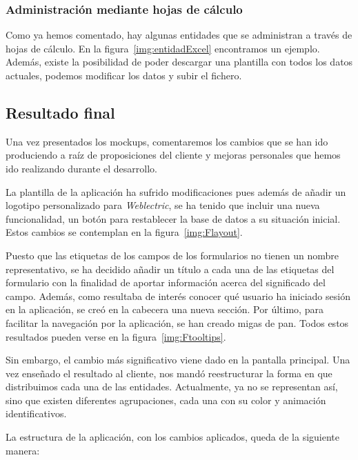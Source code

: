 \subsubsection{Administración mediante hojas de cálculo} 

Como ya hemos comentado, hay algunas entidades que se administran a través de hojas de cálculo. En la figura~\ref{img:entidadExcel} encontramos un ejemplo. Además, existe la posibilidad de poder descargar una plantilla con todos los datos actuales, podemos modificar los datos y subir el fichero. 

\newpage

\subsection{Resultado final} 

Una vez presentados los mockups, comentaremos los cambios que se han ido produciendo a raíz de proposiciones del cliente y mejoras personales que hemos ido realizando durante el desarrollo.

La plantilla de la aplicación ha sufrido modificaciones pues además de añadir un logotipo personalizado para \textit{Weblectric}, se ha tenido que incluir una nueva funcionalidad, un botón para restablecer la base de datos a su situación inicial. Estos cambios se contemplan en la figura~\ref{img:Flayout}.

Puesto que las etiquetas de los campos de los formularios no tienen un nombre representativo, se ha decidido añadir un título a cada una de las etiquetas del formulario con la finalidad de aportar información acerca del significado del campo. Además, como resultaba de interés conocer qué usuario ha iniciado sesión en la aplicación, se creó en la cabecera una nueva sección. Por último, para facilitar la navegación por la aplicación, se han creado migas de pan. Todos estos resultados pueden verse en la figura~\ref{img:Ftooltips}.

Sin embargo, el cambio más significativo viene dado en la pantalla principal. Una vez enseñado el resultado al cliente, nos mandó reestructurar la forma en que distribuimos cada una de las entidades. Actualmente, ya no se representan así, sino que existen diferentes agrupaciones, cada una con su color y animación identificativos.

La estructura de la aplicación, con los cambios aplicados, queda de la siguiente manera:

